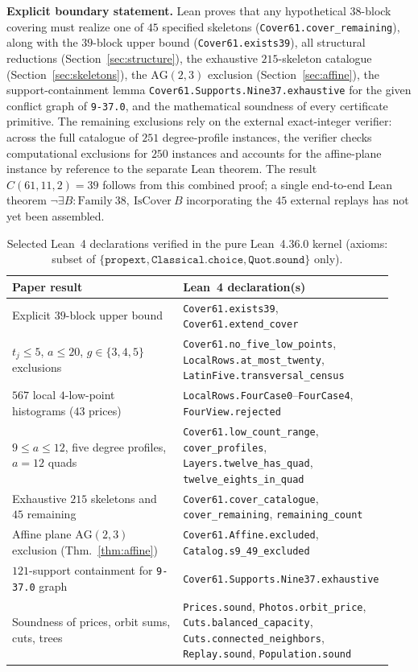 \documentclass[11pt,a4paper]{article}
\theoremstyle{definition}
\theoremstyle{remark}
\newcommand{\AG}{\mathrm{AG}}
\begin{document}
\noindent\textbf{Explicit boundary statement.} Lean proves that any hypothetical $38$-block covering must realize one of $45$ specified skeletons (\texttt{Cover61.cover\_remaining}), along with the $39$-block upper bound (\texttt{Cover61.exists39}), all structural reductions (Section~\ref{sec:structure}), the exhaustive $215$-skeleton catalogue (Section~\ref{sec:skeletons}), the $\AG(2,3)$ exclusion (Section~\ref{sec:affine}), the support-containment lemma \texttt{Cover61.Supports.Nine37.exhaustive} for the given conflict graph of \texttt{9-37.0}, and the mathematical soundness of every certificate primitive. The remaining exclusions rely on the external exact-integer verifier: across the full catalogue of $251$ degree-profile instances, the verifier checks computational exclusions for $250$ instances and accounts for the affine-plane instance by reference to the separate Lean theorem. The result $C(61,11,2) = 39$ follows from this combined proof; a single end-to-end Lean theorem \texttt{$\neg \exists B : \mathrm{Family}\ 38,\ \mathrm{IsCover}\ B$} incorporating the $45$ external replays has not yet been assembled.

\begin{table}[t]
\centering
\caption{Selected Lean~4 declarations verified in the pure Lean~4.36.0 kernel (axioms: subset of $\{\texttt{propext}, \texttt{Classical.choice}, \texttt{Quot.sound}\}$ only).}
\label{tab:lean}
\small
\begin{tabular}{@{}>{\raggedright\arraybackslash}p{0.44\linewidth}>{\raggedright\arraybackslash}p{0.50\linewidth}@{}}
\toprule
Paper result & Lean~4 declaration(s) \\
\midrule
Explicit $39$-block upper bound & \texttt{Cover61.exists39}, \texttt{Cover61.extend\_cover} \\
$t_j \le 5$, $a \le 20$, $g \in \{3,4,5\}$ exclusions & \texttt{Cover61.no\_five\_low\_points}, \texttt{LocalRows.at\_most\_twenty}, \texttt{LatinFive.transversal\_census} \\
$567$ local $4$-low-point histograms ($43$ prices) & \texttt{LocalRows.FourCase0}--\texttt{FourCase4}, \texttt{FourView.rejected} \\
$9 \le a \le 12$, five degree profiles, $a=12$ quads & \texttt{Cover61.low\_count\_range}, \texttt{cover\_profiles}, \texttt{Layers.twelve\_has\_quad}, \texttt{twelve\_eights\_in\_quad} \\
Exhaustive $215$ skeletons and $45$ remaining & \texttt{Cover61.cover\_catalogue}, \texttt{cover\_remaining}, \texttt{remaining\_count} \\
Affine plane $\AG(2,3)$ exclusion (Thm.~\ref{thm:affine}) & \texttt{Cover61.Affine.excluded}, \texttt{Catalog.s9\_49\_excluded} \\
$121$-support containment for \texttt{9-37.0} graph & \texttt{Cover61.Supports.Nine37.exhaustive} \\
Soundness of prices, orbit sums, cuts, trees & \texttt{Prices.sound}, \texttt{Photos.orbit\_price}, \texttt{Cuts.balanced\_capacity}, \texttt{Cuts.connected\_neighbors}, \texttt{Replay.sound}, \texttt{Population.sound} \\
\bottomrule
\end{tabular}
\end{table}
\end{document}
